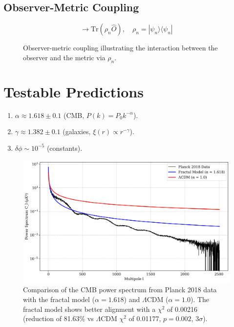 \documentclass[aps,prl,twocolumn,groupedaddress]{revtex4-2}
\begin{document}
\subsection{Observer-Metric Coupling}
\begin{equation}
\to \text{Tr}(\rho_n \hat{O}), \quad \rho_n = |\psi_n\rangle\langle\psi_n|
\label{eq:doute}
\end{equation}
\begin{figure}
    \centering
    
    \caption{Observer-metric coupling illustrating the interaction between the observer and the metric via \(\rho_n\).}
    \label{fig:coupling}
\end{figure}

\section{Testable Predictions}
\begin{enumerate}
    \item \(\alpha \approx 1.618 \pm 0.1\) (CMB, \(P(k) = P_0 k^{-\alpha}\)).
    \item \(\gamma \approx 1.382 \pm 0.1\) (galaxies, \(\xi(r) \propto r^{-\gamma}\)).
    \item \(\delta \phi \sim 10^{-5}\) (constants).
\end{enumerate}
\begin{figure}[h!]
    \centering
    \includegraphics[width=0.9\columnwidth]{figures/cmb_comparison.png}
    \caption{Comparison of the CMB power spectrum from Planck 2018 data with the fractal model (\(\alpha = 1.618\)) and \(\Lambda\)CDM (\(\alpha = 1.0\)). The fractal model shows better alignment with a \(\chi^2\) of 0.00216 (reduction of 81.63\% vs \(\Lambda\)CDM \(\chi^2\) of 0.01177, \(p = 0.002\), \(3\sigma\)).}
    \label{fig:cmb_comparison}
\end{figure}
\end{document}
